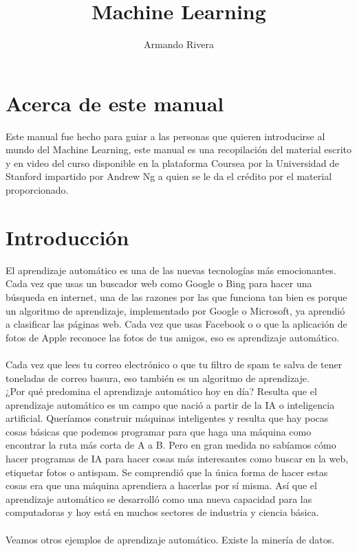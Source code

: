 \documentclass{report}
\author{Armando Rivera}
\title{Machine Learning}
\begin{document}
\maketitle
\renewcommand{\tablename}{Tabla}
\renewcommand{\listtablename}{Índice de tablas}
\tableofcontents
\listoffigures
\listoftables
\chapter*{Acerca de este manual}
Este manual fue hecho para guiar a las personas que quieren introducirse al mundo del Machine Learning, este manual es una recopilación del material escrito y en video del curso disponible en la plataforma Coursea por la Universidad de Stanford impartido por Andrew Ng a quien se le da el crédito por el material proporcionado. 
\chapter{Introducción}
El aprendizaje automático es una
de las nuevas tecnologías más emocionantes. Cada vez que usas un buscador web como Google o Bing para hacer una
búsqueda en internet, una de las razones por las que funciona tan bien es porque
un algoritmo de aprendizaje, implementado por Google o Microsoft, ya aprendió a clasificar las
páginas web. Cada vez que usas Facebook o o que la aplicación de fotos de Apple
reconoce las fotos de tus amigos, eso es aprendizaje automático. \\\\Cada vez que lees
tu correo electrónico o que tu filtro de spam te salva de tener toneladas de correo basura,
eso también es un algoritmo de aprendizaje.\\¿Por qué
predomina el aprendizaje automático hoy en día? Resulta que el aprendizaje automático es un
campo que nació a partir de la IA o inteligencia artificial. Queríamos
construir máquinas inteligentes y resulta que hay pocas cosas básicas que
podemos programar para que haga una máquina como encontrar la ruta más corta de A a B.
Pero en gran medida no sabíamos cómo hacer programas de IA para hacer cosas
más interesantes como buscar en la web, etiquetar fotos o antispam. Se comprendió
que la única forma de hacer estas cosas era que una máquina aprendiera
a hacerlas por sí misma. Así que el aprendizaje automático se desarrolló como una nueva capacidad
para las computadoras y hoy está en muchos sectores de industria y ciencia básica.\\\\Veamos otros ejemplos de aprendizaje automático. Existe la minería de datos.
\end{document}
